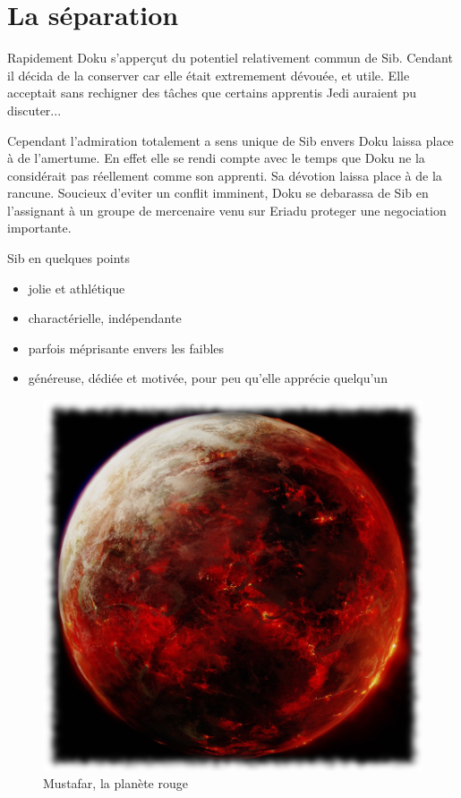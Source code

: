 \documentclass[10pt,a4paper,twoside,twocolumn,openany]{book}
\begin{document}
\section{La séparation}
Rapidement Doku s'apperçut du potentiel relativement commun de Sib. Cendant il décida de la conserver car elle était extremement dévouée, et utile. Elle acceptait sans rechigner des tâches que certains apprentis Jedi auraient pu discuter...

Cependant l'admiration totalement a sens unique de Sib envers Doku laissa
place à de l'amertume. En effet elle se rendi compte avec le temps que Doku
 ne la considérait pas réellement comme son apprenti.
Sa dévotion laissa place à de la rancune. Soucieux d'eviter un conflit imminent, Doku se debarassa de Sib en
l'assignant à un groupe de mercenaire venu sur Eriadu proteger une negociation importante.

\begin{commentbox}{Sib en quelques points}

\begin{itemize}
\item jolie et athlétique
\item charactérielle, indépendante
\item parfois méprisante envers les faibles
\item généreuse, dédiée et motivée, pour peu qu'elle apprécie quelqu'un
\end{itemize}

\end{commentbox}

\vspace{2cm}

\begin{figure}
\centering
\includegraphics[scale=0.4]{mustafar.png}
\caption*{\color{white}Mustafar, la planète rouge}
\end{figure}
\end{document}
